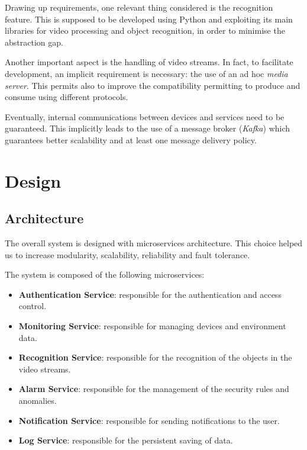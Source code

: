 \documentclass{scrartcl}
\begin{document}
    Drawing up requirements, one relevant thing considered is the recognition feature. This is supposed to be developed using Python and exploiting its main libraries for video processing and object recognition, in order to minimise the abstraction gap.

    Another important aspect is the handling of video streams. In fact, to facilitate development, an implicit requirement is necessary: the use of an ad hoc \textit{media server}. This permits also to improve the compatibility permitting to produce and consume using different protocols.

    Eventually, internal communications between devices and services need to be guaranteed. This implicitly leads to the use of a message broker (\textit{Kafka}) which guarantees better scalability and at least one message delivery policy.


    \section{Design}




    \subsection{Architecture}

    The overall system is designed with microservices architecture.
%
    This choice helped us to increase modularity, scalability, reliability and fault tolerance.

    The system is composed of the following microservices:
    \begin{itemize}
        \item \textbf{Authentication Service}: responsible for the authentication and access control.
        \item \textbf{Monitoring Service}: responsible for managing devices and environment data.
        \item \textbf{Recognition Service}: responsible for the recognition of the objects in the video streams.
        \item \textbf{Alarm Service}: responsible for the management of the security rules and anomalies.
        \item \textbf{Notification Service}: responsible for sending notifications to the user.
        \item \textbf{Log Service}: responsible for the persistent saving of data.
    \end{itemize}
\end{document}
